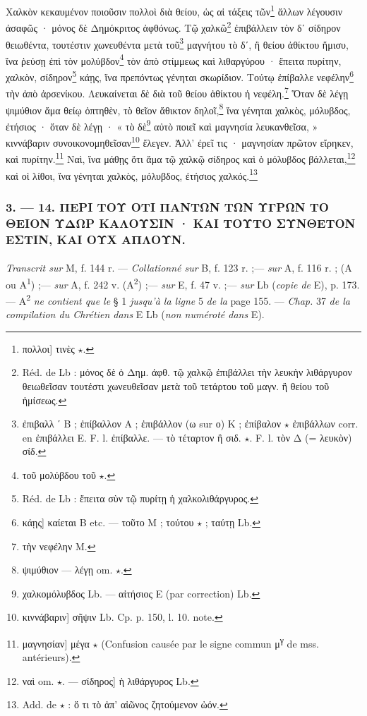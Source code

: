 \documentclass[landscape, a4paper, 11pt, oneside, polutonikogreek, french]{article}
\begin{document}
\bigskip

Χαλκὸν κεκαυμένον ποιοῦσιν πολλοὶ διὰ θείου, ὡς αἱ τάξεις τῶν\footnote{πολλοι] τινὲς $\star$.} ἄλλων λέγουσιν ἀσαφῶς · μόνος δὲ Δημόκριτος ἀφθόνως. Τῷ χαλκῶ\footnote{Réd. de Lb : μόνος δὲ ὁ Δημ. ἀφθ. τῷ χαλκῷ ἐπιβάλλει τὴν λευκὴν λιθάργυρον θειωθεῖσαν τουτέστι χωνευθεῖσαν μετὰ τοῦ τετάρτου τοῦ μαγν. ἢ θείου τοῦ ἡμίσεως.} ἐπιβάλλειν τὸν δʹ σίδηρον θειωθέντα, τουτέστιν χωνευθέντα μετὰ τοῦ\footnote{ἐπιβαλλ ʹ B ; ἐπίβαλλον A ; ἐπιβάλλον (ω sur ο) K ; ἐπίβαλον $\star$ ἐπιβάλλων corr. en ἐπιβάλλει E. F. l. ἐπίβαλλε. --- τὸ τέταρτον ἢ σιδ. $\star$. F. l. τὸν Δ (= λευκὸν) σίδ.} μαγνήτου τὸ δʹ, ἢ θείου ἀθίκτου ἥμισυ, ἵνα ῥεύσῃ ἐπὶ τὸν μολύβδον\footnote{τοῦ μολύβδου τοῦ $\star$.} τὸν ἀπὸ στίμμεως καὶ λιθαργύρου · ἔπειτα πυρίτην, χαλκὸν, σίδηρον\footnote{Réd. de Lb : ἔπειτα σὺν τῷ πυρίτῃ ἡ χαλκολιθάργυρος.} κάῃς, ἵνα πρεπόντως γένηται σκωρίδιον. Τούτῳ ἐπίβαλλε νεφέλην\footnote{κάῃς] καίεται B etc. --- τοῦτο M ; τούτου $\star$ ; ταύτῃ Lb.} τὴν ἀπὸ ἀρσενίκου. Λευκαίνεται δὲ διὰ τοῦ θείου ἀθίκτου ἡ νεφέλη.\footnote{τὴν νεφέλην M.} Ὅταν δὲ λέγῃ ψιμύθιον ἅμα θείῳ ὀπτηθὲν, τὸ θεῖον ἄθικτον δηλοῖ,\footnote{ψιμύθιον --- λέγῃ om. $\star$.} ἵνα γένηται χαλκὸς, μόλυβδος, ἐτήσιος · ὅταν δὲ λέγῃ · « τὸ δὲ\footnote{χαλκομόλυβδος Lb. --- αἰτήσιος E (par correction) Lb.} αὐτὸ ποιεῖ καὶ μαγνησία λευκανθεῖσα, » κιννάβαριν συνοικονομηθεῖσαν\footnote{κιννάβαριν] σῆψιν Lb. Cp. p. 150, l. 10. note.} ἔλεγεν. Ἀλλ' ἐρεῖ τις · μαγνησίαν πρῶτον εἴρηκεν, καὶ πυρίτην.\footnote{μαγνησίαν] μέγα $\star$ (Confusion causée par le signe commun μ\textsuperscript{γ} de mss. antérieurs).} Ναὶ, ἵνα μάθῃς ὅτι ἅμα τῷ χαλκῷ σίδηρος καὶ ὁ μόλυβδος βάλλεται,\footnote{ναὶ om. $\star$. --- σίδηρος] ἡ λιθάργυρος Lb.} καὶ οἱ λίθοι, ἵνα γένηται χαλκὸς, μόλυβδος, ἐτήσιος χαλκός.\footnote{Add. de $\star$ : ὅ τι τὸ ἀπ' αἰῶνος ζητούμενον ὠόν.}

\bigskip
\centerline{\EightStarTaper}
\centerline{\EightStarTaper\EightStarTaper}
\bigskip

\subsubsection{3. --- 14. ΠΕΡΙ ΤΟΥ ΟΤΙ ΠΑΝΤΩΝ ΤΩΝ ΥΓΡΩΝ ΤΟ ΘΕΙΟΝ ΥΔΩΡ ΚΑΛΟΥΣΙΝ · ΚΑΙ ΤΟΥΤΟ ΣΥΝΘΕΤΟΝ ΕΣΤΙΝ, ΚΑΙ ΟΥΧ ΑΠΛΟΥΝ.}
\paragraph{}
\emph{Transcrit sur} M, f. 144 r. --- \emph{Collationné sur} B, f. 123 r. ;--- \emph{sur} A, f. 116 r. ; (A ou A\textsuperscript{1}) ;--- \emph{sur} A, f. 242 v. (A\textsuperscript{2}) ;--- \emph{sur} E, f. 47 v. ;--- \emph{sur} Lb (\emph{copie de} E), p. 173. --- A\textsuperscript{2} \emph{ne contient que le} § 1 \emph{jusqu'à la ligne} 5 \emph{de la} page 155. --- \emph{Chap.} 37 \emph{de la compilation du Chrétien dans} E Lb (\emph{non numéroté dans} E).
\end{document}

